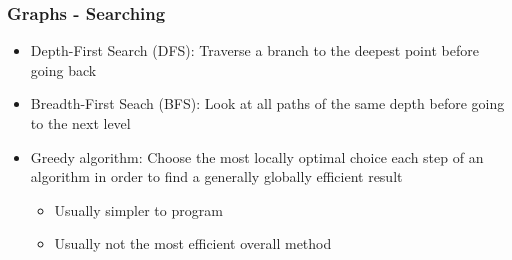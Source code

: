 \begin{frame}\frametitle{Graphs - Searching}
\begin{itemize}
\item Depth-First Search (DFS): Traverse a branch to the deepest point before going back
\item Breadth-First Seach (BFS): Look at all paths of the same depth before going to the next level
\item Greedy algorithm: Choose the most locally optimal choice each step of an algorithm in order to find a generally globally efficient result
	\begin{itemize}
	\item Usually simpler to program
	\item Usually not the most efficient overall method
	\end{itemize}
\end{itemize}
\end{frame}
